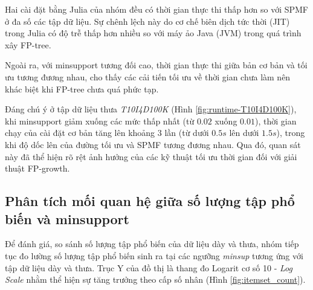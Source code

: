 \documentclass[conference]{IEEEtran}
\begin{document}
Hai cài đặt bằng Julia của nhóm đều có thời gian thực thi thấp hơn so với SPMF ở đa số các tập dữ liệu. Sự chênh lệch này do cơ chế biên dịch tức thời (JIT) trong Julia có độ trễ thấp hơn nhiều so với máy ảo Java (JVM) trong quá trình xây FP-tree.

Ngoài ra, với minsupport tương đối cao, thời gian thực thi giữa bản cơ bản và tối ưu tương đương nhau, cho thấy các cải tiến tối ưu về thời gian chưa làm nên khác biệt khi FP-tree chưa quá phức tạp.

Đáng chú ý ở tập dữ liệu thưa \textit{T10I4D100K} (Hình \ref{fig:runtime-T10I4D100K}), khi minsupport giảm xuống các mức thấp nhất (từ $0.02$ xuống $0.01$), thời gian chạy của cài đặt cơ bản tăng lên khoảng $3$ lần (từ dưới $0.5s$ lên dưới $1.5s$), trong khi độ dốc lên của đường tối ưu và SPMF tương đương nhau. Qua đó, quan sát này đã thể hiện rõ rệt ảnh hưởng của các kỹ thuật tối ưu thời gian đối với giải thuật FP-growth.

\subsection{Phân tích mối quan hệ giữa số lượng tập phổ biến và minsupport}
Để đánh giá, so sánh số lượng tập phổ biến của dữ liệu dày và thưa, nhóm tiếp tục đo lường số lượng tập phổ biến sinh ra tại các ngưỡng \textit{minsup} tương ứng với tập dữ liệu dày và thưa. Trục Y của đồ thị là thang đo Logarit cơ số 10 - \textit{Log Scale} nhằm thể hiện sự tăng trưởng theo cấp số nhân (Hình \ref{fig:itemset_count}).
\end{document}
